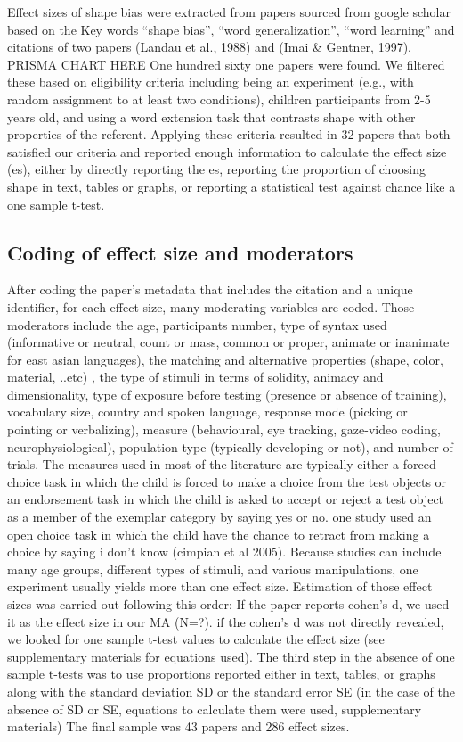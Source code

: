 \documentclass[
  man]{apa6}
\begin{document}
Effect sizes of shape bias were extracted from papers sourced from google scholar based on the Key words ``shape bias'', ``word generalization'', ``word learning'' and citations of two papers (Landau et al., 1988) and (Imai \& Gentner, 1997).
PRISMA CHART HERE
One hundred sixty one papers were found. We filtered these based on eligibility criteria including being an experiment (e.g., with random assignment to at least two conditions), children participants from 2-5 years old, and using a word extension task that contrasts shape with other properties of the referent. Applying these criteria resulted in 32 papers that both satisfied our criteria and reported enough information to calculate the effect size (es), either by directly reporting the es, reporting the proportion of choosing shape in text, tables or graphs, or reporting a statistical test against chance like a one sample t-test.

\hypertarget{coding-of-effect-size-and-moderators}{%
\subsection{Coding of effect size and moderators}\label{coding-of-effect-size-and-moderators}}

After coding the paper's metadata that includes the citation and a unique identifier, for each effect size, many moderating variables are coded. Those moderators include the age, participants number, type of syntax used (informative or neutral, count or mass, common or proper, animate or inanimate for east asian languages), the matching and alternative properties (shape, color, material, ..etc) , the type of stimuli in terms of solidity, animacy and dimensionality, type of exposure before testing (presence or absence of training), vocabulary size, country and spoken language, response mode (picking or pointing or verbalizing), measure (behavioural, eye tracking, gaze-video coding, neurophysiological), population type (typically developing or not), and number of trials. The measures used in most of the literature are typically either a forced choice task in which the child is forced to make a choice from the test objects or an endorsement task in which the child is asked to accept or reject a test object as a member of the exemplar category by saying yes or no. one study used an open choice task in which the child have the chance to retract from making a choice by saying i don't know (cimpian et al 2005).
Because studies can include many age groups, different types of stimuli, and various manipulations, one experiment usually yields more than one effect size. Estimation of those effect sizes was carried out following this order: If the paper reports cohen's d, we used it as the effect size in our MA (N=?). if the cohen's d was not directly revealed, we looked for one sample t-test values to calculate the effect size (see supplementary materials for equations used). The third step in the absence of one sample t-tests was to use proportions reported either in text, tables, or graphs along with the standard deviation SD or the standard error SE (in the case of the absence of SD or SE, equations to calculate them were used, supplementary materials)
The final sample was 43 papers and 286 effect sizes.
\end{document}
